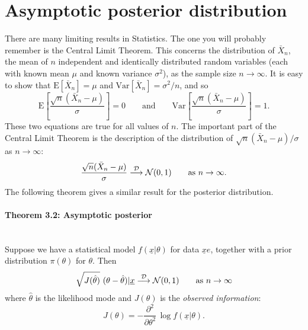 \clearpage


\section{Asymptotic posterior distribution}
There are many limiting results in Statistics. The one you will probably remember is the Central Limit Theorem. This concerns the distribution of $\bar X_n$, the mean of $n$ independent and identically distributed random variables (each with known mean $\mu$ and known variance $\sigma^2$), as the sample size $n\to\infty$. It is easy to show that $\text{E}[\bar X_n]=\mu$ and $\text{Var}[\bar X_n]=\sigma^2/n$, and so 
$$
\text{E}\left[\frac{\sqrt{n}(\bar{X}_{n}-\mu)}{\sigma}\right] = 0 \qquad \text{and} \qquad \text{Var}\left[\frac{\sqrt{n}(\bar{X}_{n}-\mu)}{\sigma}\right]=1.
$$
These two equations are true for all values of $n$.  The important part of the Central Limit Theorem is the description of the distribution of $\sqrt{n}(\bar{X}_{n}-\mu)/\sigma$ as $n \to \infty$: 
\begin{equation*}
\frac{\sqrt{n}(\bar X_n-\mu)}{\sigma}\stackrel{\cal D} \longrightarrow
\mathcal{N}(0,1)\quad\quad\text{as }n\to\infty.
\end{equation*}
The following theorem gives a similar result for the posterior
distribution. 

\paragraph{Theorem 3.2: Asymptotic posterior}{\label{theorem: asymptotic posterior} ~\\ 
Suppose we have a statistical model $f(\underline{x}|\theta)$ for data
$\underline{x}e$, together with a prior distribution $\pi(\theta)$ for
$\theta$. Then
$$\sqrt{J(\hat{\theta})}~(\theta-\hat{\theta})|\underline{x} \stackrel{\cal D}
  \longrightarrow \mathcal{N}(0,1)
  \quad\quad\text{as }n\to\infty $$
    where $\hat{\theta}$ is the likelihood mode and $J(\theta)$
    is the \emph{observed information}:
    $$ J(\theta)=-\frac{\partial^2}{\partial\theta^2}\, \log f(\underline{x}|\theta).$$}
\clearpage

